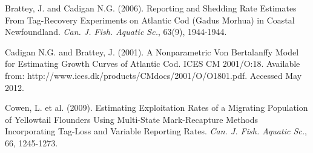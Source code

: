 \documentclass[paperwidth=58in,paperheight=47in,portrait]{baposter}
\begin{document}
\begin{poster}
{\begin{thebibliography}{1}
 Brattey, J. and Cadigan N.G. (2006). Reporting and Shedding Rate Estimates From Tag-Recovery Experiments on Atlantic Cod (Gadus Morhua) in Coastal Newfoundland. \emph{Can. J. Fish. Aquatic Sc.}, 63(9), 1944-1944.

 Cadigan N.G. and Brattey, J. (2001). A Nonparametric Von Bertalanffy Model for Estimating Growth Curves of Atlantic Cod. ICES CM 2001/O:18. Available from: http://www.ices.dk/products/CMdocs/2001/O/O1801.pdf. Accessed May 2012.

 Cowen, L. et al. (2009). Estimating Exploitation Rates of a Migrating Population of Yellowtail Flounders Using Multi-State Mark-Recapture Methods Incorporating Tag-Loss and Variable Reporting Rates. \emph{Can. J. Fish. Aquatic Sc.}, 66, 1245-1273.

\end{thebibliography}
}


\end{poster}
\end{document}
